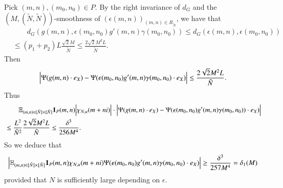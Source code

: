 \documentclass[12pt,amstex]{amsart}
\theoremstyle{definition}
\def \d {\delta}
\def \e {\epsilon}
\def \R {R_{\tilde{N}}}
\begin{document}
Pick $(m,n),(m_{0},n_{0})\in P$. By the right invariance of $d_{G}$ and the $(M,(\tilde{N},\tilde{N}))$-smoothness of $(\e(m,n))_{(m,n)\in \R}$, we have that
  \begin{equation}\nonumber
   \begin{split}
   &\qquad d_{G}(g(m,n),\e(m_{0},n_{0})g'(m,n)\gamma(m_{0},n_{0}))\leq d_{G}(\e(m,n),\e(m_{0},n_{0}))
   \\&\leq (p_{1}+p_{2})L\frac{\sqrt{2}M}{\tilde{N}}\leq \frac{2\sqrt{2}M^{2}L}{\tilde{N}}.
   \end{split}
  \end{equation}
  Then
  \begin{equation}\nonumber
   \begin{split}
   \Bigl\vert\Psi(g(m,n)\cdot e_{X})-\Psi(\e(m_{0},n_{0})g'(m,n)\gamma(m_{0},n_{0})\cdot e_{X})\Bigr\vert\leq \frac{2\sqrt{2}M^{2}L}{\tilde{N}}.
   \end{split}
  \end{equation}
Thus
  \begin{equation}\nonumber
   \begin{split}
   &\qquad\mathbb{E}_{(m,n)\in [\tilde{N}]\times[\tilde{N}]}\bold{1}_{P}(m,n)\Bigl\vert\chi_{N,u}(m+ni)\Bigr\vert\cdot\Bigl\vert\Psi(g(m,n)\cdot e_{X})
   -\Psi(\e(m_{0},n_{0})g'(m,n)\gamma(m_{0},n_{0}))\cdot e_{X})\Bigr\vert
   \\&\leq
   \frac{L^{2}}{\tilde{N}^{2}}\frac{2\sqrt{2}M^{2}L}{\tilde{N}}\leq\frac{\d^{3}}{256M^{4}}.
   \end{split}
  \end{equation}
  So we deduce that
  \begin{equation}\label{temp1}
   \begin{split}
   \Bigl\vert\mathbb{E}_{(m,n)\in [\tilde{N}]\times[\tilde{N}]}\bold{1}_{P}(m,n)\chi_{N,u}(m+ni)\Psi(\e(m_{0},n_{0})g'(m,n)\gamma(m_{0},n_{0})\cdot e_{X})\Bigr\vert\geq\frac{\d^{3}}{257M^{4}}=\d_{1}(M)
  \end{split}
  \end{equation}
  provided that $N$ is sufficiently large depending on $\e$.
\end{document}

